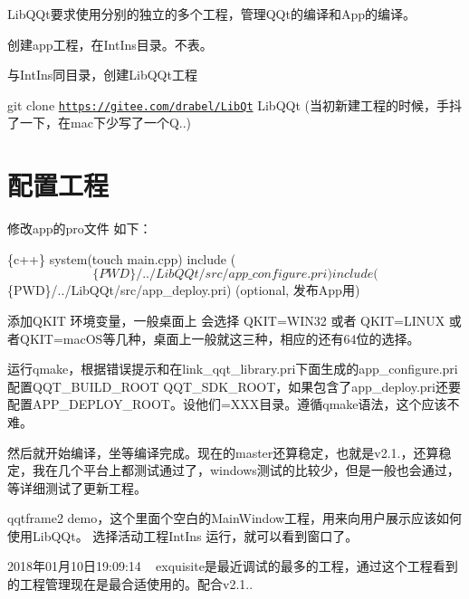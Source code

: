 Lib\+Q\+Qt要求使用分别的独立的多个工程，管理\+Q\+Qt的编译和\+App的编译。
\begin{DoxyItemize}
\item 创建app工程，在\+Int\+Ins目录。不表。
\item 与\+Int\+Ins同目录，创建\+Lib\+Q\+Qt工程
\begin{DoxyItemize}
\item git clone \href{https://gitee.com/drabel/LibQt}{\tt https\+://gitee.\+com/drabel/\+Lib\+Qt} Lib\+Q\+Qt (当初新建工程的时候，手抖了一下，在mac下少写了一个Q..)
\end{DoxyItemize}
\end{DoxyItemize}

\section*{配置工程}

修改app的pro文件 如下：


\begin{DoxyCode}
\{c++\}
system(touch main.cpp)
include ($$\{PWD\}/../LibQQt/src/app\_configure.pri)
include ($$\{PWD\}/../LibQQt/src/app\_deploy.pri) (optional, 发布App用)
\end{DoxyCode}



\begin{DoxyItemize}
\item 添加\+Q\+K\+IT 环境变量，一般桌面上 会选择 Q\+K\+IT=W\+I\+N32 或者 Q\+K\+IT=L\+I\+N\+UX 或者\+Q\+K\+IT=mac\+O\+S等几种，桌面上一般就这三种，相应的还有64位的选择。
\item 运行qmake，根据错误提示和在link\+\_\+qqt\+\_\+library.\+pri下面生成的app\+\_\+configure.\+pri配置\+Q\+Q\+T\+\_\+\+B\+U\+I\+L\+D\+\_\+\+R\+O\+OT Q\+Q\+T\+\_\+\+S\+D\+K\+\_\+\+R\+O\+O\+T，如果包含了app\+\_\+deploy.\+pri还要配置\+A\+P\+P\+\_\+\+D\+E\+P\+L\+O\+Y\+\_\+\+R\+O\+O\+T。设他们=X\+X\+X目录。遵循qmake语法，这个应该不难。
\item 然后就开始编译，坐等编译完成。现在的master还算稳定，也就是v2.1.，还算稳定，我在几个平台上都测试通过了，windows测试的比较少，但是一般也会通过，等详细测试了更新工程。
\end{DoxyItemize}

qqtframe2 demo，这个里面个空白的\+Main\+Window工程，用来向用户展示应该如何使用\+Lib\+Q\+Qt。 选择活动工程\+Int\+Ins 运行，就可以看到窗口了。

2018年01月10日19\+:09\+:14 ~\newline
exquisite是最近调试的最多的工程，通过这个工程看到的工程管理现在是最合适使用的。配合v2.1.. 